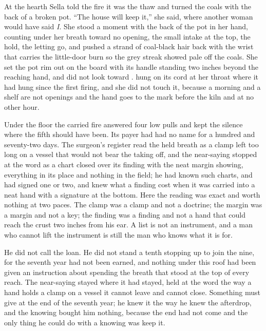 \scenebreak

At the hearth Sella told the fire it was the thaw and turned the coals with the back of a broken pot. “The house will keep it,” she said, where another woman would have said \emph{I}. She stood a moment with the back of the pot in her hand, counting under her breath toward no opening, the small intake at the top, the hold, the letting go, and pushed a strand of coal-black hair back with the wrist that carries the little-door burn so the grey streak showed pale off the coals. She set the pot rim out on the board with its handle standing two inches beyond the reaching hand, and did not look toward .  hung on its cord at her throat where it had hung since the first firing, and she did not touch it, because a morning and a shelf are not openings and the hand goes to the mark before the kiln and at no other hour.

Under the floor the carried fire answered four low pulls and kept the silence where the fifth should have been. Its payer had had no name for a hundred and seventy-two days. The surgeon's register read the held breath as a clamp left too long on a vessel that would not bear the taking off, and the near-saying stopped at the word as a chart closed over its finding with the neat margin showing, everything in its place and nothing in the field; he had known such charts, and had signed one or two, and knew what a finding cost when it was carried into a neat hand with a signature at the bottom. Here the reading was exact and worth nothing at two paces. The clamp was a clamp and not a doctrine; the margin was a margin and not a key; the finding was a finding and not a hand that could reach the crust two inches from his ear. A list is not an instrument, and a man who cannot lift the instrument is still the man who knows what it is for.

He did not call the loan. He did not stand a tenth stopping up to join the nine, for the seventh year had not been earned, and nothing under this roof had been given an instruction about spending the breath that stood at the top of every reach. The near-saying stayed where it had stayed, held at the word the way a hand holds a clamp on a vessel it cannot leave and cannot close. Something must give at the end of the seventh year; he knew it the way he knew the afterdrop, and the knowing bought him nothing, because the end had not come and the only thing he could do with a knowing was keep it.

